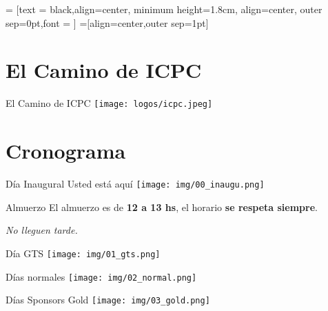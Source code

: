 \documentclass{beamer}
\begin{document}
 = [text = black,align=center, minimum height=1.8cm, align=center, outer sep=0pt,font = \footnotesize]
 =[align=center,outer sep=1pt]

\section{El Camino de ICPC}

\begin{frame}{El Camino de ICPC}
    \centering
    \texttt{[image: logos/icpc.jpeg]}

\end{frame}

\section{Cronograma}


\begin{frame}{Día Inaugural}
    Usted está aquí
    \centering
    \texttt{[image: img/00\_inaugu.png]}
\end{frame}

\begin{frame}{Almuerzo}
    \centering
    El almuerzo es de {\bfseries 12 a 13 hs}, el horario \textbf{se respeta siempre}.

    \textit{No lleguen tarde.}
\end{frame}


\begin{frame}{Día GTS}
    \centering
    \texttt{[image: img/01\_gts.png]}
\end{frame}

\begin{frame}{Días normales}
    \centering
    \texttt{[image: img/02\_normal.png]}
\end{frame}


\begin{frame}{Días Sponsors Gold}
    \centering
    \texttt{[image: img/03\_gold.png]}
\end{frame}
\end{document}
